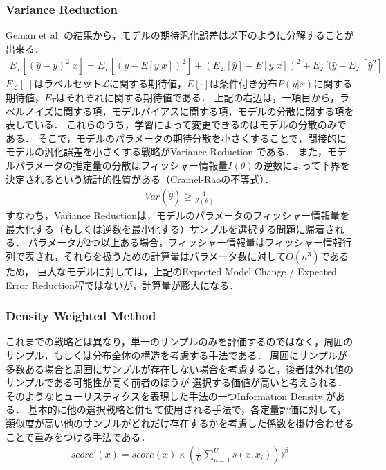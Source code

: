 \subsubsection{Variance Reduction \cite{cohn1994improving}}
Geman et al. \cite{geman2008neural}の結果から，モデルの期待汎化誤差は以下のように分解することが出来る．
\begin{eqnarray}
    E_T [(\hat{y} - y)^2|x] = E_T [(y - E[y|x])^2] + (E_{\mathcal{L}}[\hat{y}] - E[y|x])^2 + E_{\mathcal{L}} [(\hat{y} - E_{\mathcal{L}}[\hat{y}^2]
\end{eqnarray}
$E_{\mathcal{L}}[\cdot]$はラベルセット$\mathcal{L}$に関する期待値，$E[\cdot]$は条件付き分布$P(y|x)$に関する期待値，$E_T$はそれぞれに関する期待値である．
上記の右辺は，一項目から，ラベルノイズに関する項，モデルバイアスに関する項，モデルの分散に関する項を表している．
これらのうち，学習によって変更できるのはモデルの分散のみである．
そこで，モデルのパラメータの期待分散を小さくすることで，間接的にモデルの汎化誤差を小さくする戦略がVariance Reduction \cite{cohn1994improving}である．
また，モデルパラメータの推定量の分散はフィッシャー情報量$I(\theta)$の逆数によって下界を決定されるという統計的性質がある（Cramel-Raoの不等式）．
\begin{eqnarray}
    Var(\hat{\theta}) \geq \frac{1}{\mathcal{I(\theta)}}
\end{eqnarray}
すなわち，Variance Reductionは，モデルのパラメータのフィッシャー情報量を最大化する（もしくは逆数を最小化する）サンプルを選択する問題に帰着される．
パラメータが2つ以上ある場合，フィッシャー情報量はフィッシャー情報行列で表され，それらを扱うための計算量はパラメータ数に対して$O(n^3)$であるため，
巨大なモデルに対しては，上記のExpected Model Change / Expected Error Reduction程ではないが，計算量が膨大になる．

\subsubsection{Density Weighted Method}
これまでの戦略とは異なり，単一のサンプルのみを評価するのではなく，周囲のサンプル，もしくは分布全体の構造を考慮する手法である．
周囲にサンプルが多数ある場合と周囲にサンプルが存在しない場合を考慮すると，後者は外れ値のサンプルである可能性が高く前者のほうが
選択する価値が高いと考えられる．
そのようなヒューリスティクスを表現した手法の一つInformation Density \cite{settles2008analysis}がある．
基本的に他の選択戦略と併せて使用される手法で，各定量評価に対して，類似度が高い他のサンプルがどれだけ存在するかを考慮した係数を掛け合わせることで重みをつける手法である．
\begin{eqnarray}
    score'(x) = score(x) \times (\frac{1}{U} \sum_{u=1}^{U} s(x, x_i)))^{\beta}
\end{eqnarray}

